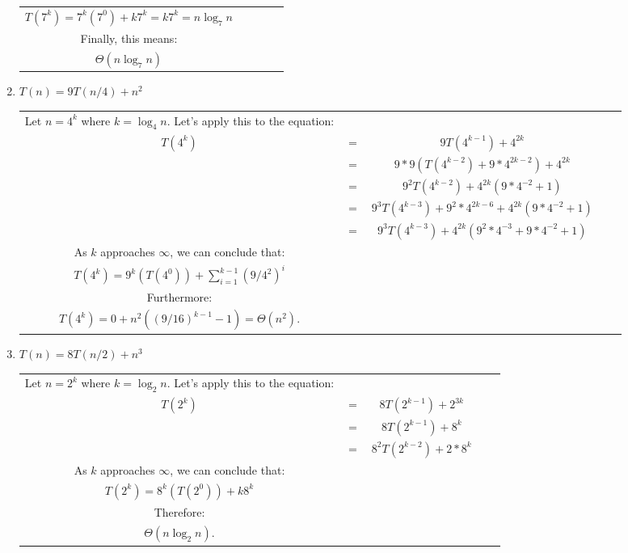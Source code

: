 \documentclass{article}
\begin{document}
\begin{enumerate}[label=(\alph*)]
\begin{center}
\begin{tabular}{c c c c c}
            $T(7^k)=7^k(7^0)+k7^k=k7^k=n\log_7{n}$\\
            Finally, this means:\\
            $\Theta(n\log_7{n})$\\
			\end{tabular}
        \end{center}
        \item $T(n)=9T(n/4)+n^2$
        	\begin{center}
        		\begin{tabular}{c c c c c}
        		Let $n=4^k$ where $k=\log_{4}n$. Let's apply this to the equation:\\
                $T(4^k)$ &$=$ &$9T(4^{k-1})+4^{2k}$\\
                &$=$ &$9*9(T(4^{k-2})+9*4^{2k-2})+4^{2k}$\\
                &$=$ &$9^2T(4^{k-2})+4^{2k}(9*4^{-2}+1)$\\
                &$=$ &$9^3T(4^{k-3})+9^2*4^{2k-6}+4^{2k}(9*4^{-2}+1)$\\
            	&$=$ &$9^3T(4^{k-3})+4^{2k}(9^2*4^{-3}+9*4^{-2}+1)$\\
               	As $k$ approaches $\infty$, we can conclude that:\\
				$T(4^k)=9^k(T(4^0))+\sum_{i=1}^{k-1}(9/4^{2})^i$\\
				Furthermore:\\
                $T(4^k)=0+n^2((9/16)^{k-1}-1)=\Theta(n^2)$.
        		\end{tabular}
        	\end{center}
           \item $T(n)=8T(n/2)+n^3$
			\begin{center}
				\begin{tabular}{c c c c c}
				  Let $n=2^k$ where $k=\log_{2}n$. Let's apply this to the equation:\\
                  $T(2^k)$ &$=$ &$8T(2^{k-1})+2^{3k}$\\
                  &$=$ &$8T(2^{k-1})+8^k$\\
                  &$=$ &$8^2T(2^{k-2})+2*8^k$\\
                  As $k$ approaches $\infty$, we can conclude that:\\
                  $T(2^k)=8^k(T(2^0))+k8^k$\\
                  Therefore:\\
                  $\Theta(n\log_{2}n)$.
				\end{tabular}
			\end{center}
            

\end{enumerate}
\end{document}
